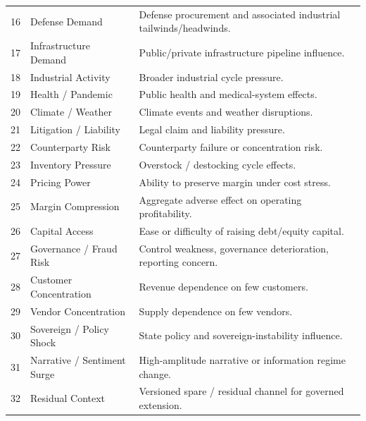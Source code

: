 \documentclass[11pt]{report}
\begin{document}
\begin{longtable}{p{}p{}p{}}
16 & Defense Demand & Defense procurement and associated industrial tailwinds/headwinds. \\
17 & Infrastructure Demand & Public/private infrastructure pipeline influence. \\
18 & Industrial Activity & Broader industrial cycle pressure. \\
19 & Health / Pandemic & Public health and medical-system effects. \\
20 & Climate / Weather & Climate events and weather disruptions. \\
21 & Litigation / Liability & Legal claim and liability pressure. \\
22 & Counterparty Risk & Counterparty failure or concentration risk. \\
23 & Inventory Pressure & Overstock / destocking cycle effects. \\
24 & Pricing Power & Ability to preserve margin under cost stress. \\
25 & Margin Compression & Aggregate adverse effect on operating profitability. \\
26 & Capital Access & Ease or difficulty of raising debt/equity capital. \\
27 & Governance / Fraud Risk & Control weakness, governance deterioration, reporting concern. \\
28 & Customer Concentration & Revenue dependence on few customers. \\
29 & Vendor Concentration & Supply dependence on few vendors. \\
30 & Sovereign / Policy Shock & State policy and sovereign-instability influence. \\
31 & Narrative / Sentiment Surge & High-amplitude narrative or information regime change. \\
32 & Residual Context & Versioned spare / residual channel for governed extension. \\
\bottomrule
\end{longtable}
\end{document}
